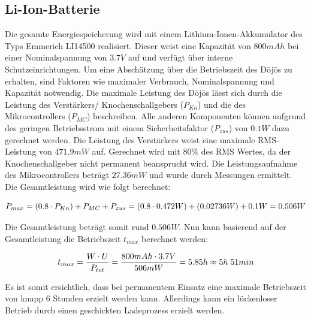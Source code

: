 \subsection{Li-Ion-Batterie}\label{sec:energiespeicher}

Die gesamte Energiespeicherung wird mit einem Lithium-Ionen-Akkumulator des Typs Emmerich LI14500 realisiert. Dieser weist eine Kapazität von $800mAh$ bei einer Nominalspannung von $3.7V$ auf und verfügt über interne Schutzeinrichtungen. Um eine Abschätzung über die Betriebszeit des Dōjōs zu erhalten, sind Faktoren wie maximaler Verbrauch, Nominalspannung und Kapazität notwendig. Die maximale Leistung des Dōjōs lässt sich durch die Leistung des Verstärkers/ Knochenschallgebers ($P_{Kn}$) und die des Mikrocontrollers ($P_{MC}$) beschreiben. Alle anderen Komponenten können aufgrund des geringen Betriebsstrom mit einem Sicherheitsfaktor ($P_{zus}$) von $0.1W$ dazu gerechnet werden. Die Leistung des Verstärkers weist eine maximale RMS-Leistung von $471.9mW$ auf. Gerechnet wird mit $80\%$ des RMS Wertes, da der Knochenschallgeber nicht permanent beansprucht wird. Die Leistungsaufnahme des Mikrocontrollers beträgt $27.36mW$ und wurde durch Messungen ermittelt. Die Gesamtleistung wird wie folgt berechnet:

\begin{equation}
\centering
P_{max}=\left(0.8\cdot P_{Kn}\right)+P_{MC}+P_{zus}=(0.8\cdot 0.472W)+(0.02736W)+0.1W=0.506W
\label{eq:MaxLeistung}
\end{equation}

Die Gesamtleistung beträgt somit rund $0.506 W$. Nun kann basierend auf der Gesamtleistung die Betriebszeit $t_{max}$ berechnet werden:

\begin{equation}
\centering
t_{max}=\frac{W\cdot U}{P_{tot}}=\frac{800mAh \cdot 3.7V}{506mW}=5.85h\approx 5h \thickspace 51min
\label{eq:Betriebszeit}
\end{equation}

Es ist somit ersichtlich, dass bei permanentem Einsatz eine maximale Betriebszeit von knapp 6 Stunden erzielt werden kann. Allerdings kann ein lückenloser Betrieb durch einen geschickten Ladeprozess erzielt werden.


